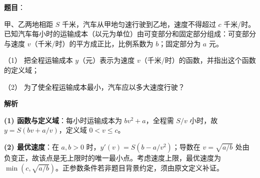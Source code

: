\begin{answer}

\textbf{题目}：

甲、乙两地相距 $S$ 千米，汽车从甲地匀速行驶到乙地，速度不得超过 $c$ 千米/时。已知汽车每小时的运输成本（以元为单位）由可变部分和固定部分组成：可变部分与速度 $v$（千米/时）的平方成正比，比例系数为 $b$；固定部分为 $a$ 元。

（1） 把全程运输成本 $y$（元）表示为速度 $v$（千米/时）的函数，并指出这个函数的定义域；

（2） 为了使全程运输成本最小，汽车应以多大速度行驶？

\textbf{解析}

\textbf{(1) 函数与定义域}：每小时运输成本为 $bv^2+a$，全程需 $S/v$ 小时，故 $y=S(bv+a/v)$，定义域 $0<v\le c$。

\textbf{(2) 最优速度}：在 $a,b>0$ 时，$y'(v)=S(b-a/v^2)$；导数在 $v=\sqrt{a/b}$ 处由负变正，故该点是无上限时的唯一最小点。考虑速度上限，最优速度为 $\min(c,\sqrt{a/b})$。正参数条件若非题目背景约定，须由原文定义补证。



\end{answer}
